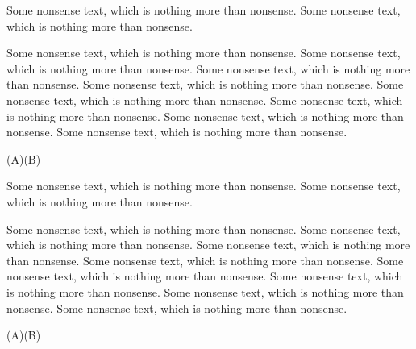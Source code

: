 \documentclass[11pt,english,BCOR=10mm,DIV=12,bibliography=totoc,parskip=false,headings=small,
    headinclude=false,footinclude=false,oneside]{pst-doc}
\begin{document}
\small
Some nonsense text, which is nothing more than nonsense.
Some nonsense text, which is nothing more than nonsense.

\noindent{}

\vspace*{-1ex}
Some nonsense text, which is nothing more than nonsense.
Some nonsense text, which is nothing more than nonsense.
Some nonsense text, which is nothing more than nonsense.
Some nonsense text, which is nothing more than nonsense.
Some nonsense text, which is nothing more than nonsense.
Some nonsense text, which is nothing more than nonsense.
Some nonsense text, which is nothing more than nonsense.
Some nonsense text, which is nothing more than nonsense.

\vspace*{-2ex}\noindent{}\psbrace*[linecolor=red](A)(B){}

Some nonsense text, which is nothing more than nonsense.
Some nonsense text, which is nothing more than nonsense.

\medskip\hfill\begin{minipage}{0.95\linewidth}
\noindent{}

\vspace*{-1ex}
Some nonsense text, which is nothing more than nonsense.
Some nonsense text, which is nothing more than nonsense.
Some nonsense text, which is nothing more than nonsense.
Some nonsense text, which is nothing more than nonsense.
Some nonsense text, which is nothing more than nonsense.
Some nonsense text, which is nothing more than nonsense.
Some nonsense text, which is nothing more than nonsense.
Some nonsense text, which is nothing more than nonsense.

\vspace*{-2ex}
\noindent{}\psbrace[linecolor=red](A)(B){}
\end{minipage}

\normalsize
\end{document}
